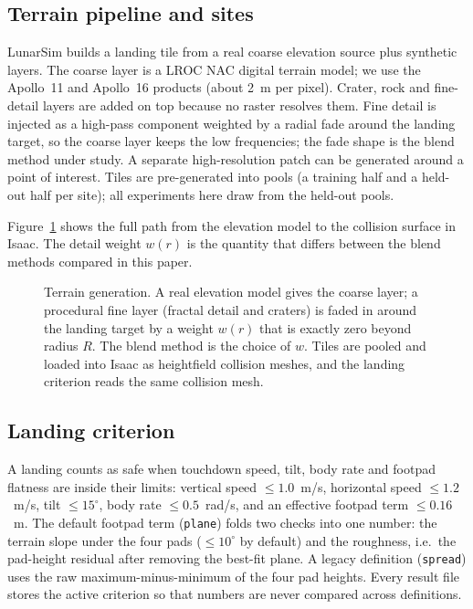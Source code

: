 \subsection{Terrain pipeline and sites}\label{sec:terrain}
LunarSim builds a landing tile from a real coarse elevation source plus synthetic layers. The coarse layer is a LROC NAC digital terrain model; we use the Apollo~11 and Apollo~16 products (about 2~m per pixel). Crater, rock and fine-detail layers are added on top because no raster resolves them. Fine detail is injected as a high-pass component weighted by a radial fade around the landing target, so the coarse layer keeps the low frequencies; the fade shape is the blend method under study. A separate high-resolution patch can be generated around a point of interest. Tiles are pre-generated into pools (a training half and a held-out half per site); all experiments here draw from the held-out pools. 

Figure~\ref{fig:flow-terrain} shows the full path from the elevation model to the collision surface in Isaac. The detail weight $w(r)$ is the quantity that differs between the blend methods compared in this paper.

\begin{figure}[t]
  \centering
  \resizebox{\textwidth}{!}{}
  \caption{Terrain generation. A real elevation model gives the coarse layer; a procedural fine layer (fractal detail and craters) is faded in around the landing target by a weight $w(r)$ that is exactly zero beyond radius $R$. The blend method is the choice of $w$. Tiles are pooled and loaded into Isaac as heightfield collision meshes, and the landing criterion reads the same collision mesh.}
  \label{fig:flow-terrain}
\end{figure}

\subsection{Landing criterion}\label{sec:criterion}
A landing counts as safe when touchdown speed, tilt, body rate and footpad flatness are inside their limits: vertical speed $\leq 1.0$~m/s, horizontal speed $\leq 1.2$~m/s, tilt $\leq 15^{\circ}$, body rate $\leq 0.5$~rad/s, and an effective footpad term $\leq 0.16$~m. The default footpad term (\texttt{plane}) folds two checks into one number: the terrain slope under the four pads ($\leq 10^{\circ}$ by default) and the roughness, i.e.\ the pad-height residual after removing the best-fit plane. A legacy definition (\texttt{spread}) uses the raw maximum-minus-minimum of the four pad heights. Every result file stores the active criterion so that numbers are never compared across definitions.

